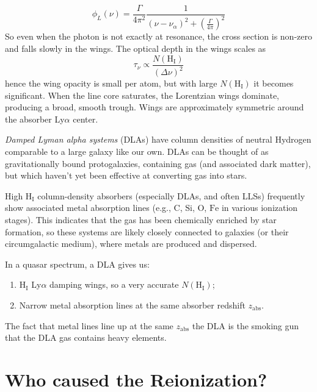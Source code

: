 \begin{equation*}
    \phi_{L}(\nu) = \frac{\Gamma}{4\pi^{2}}\frac{1}{(\nu-\nu_{\alpha})^{2}+\left(\frac{\Gamma}{4\pi}\right)^{2}}
\end{equation*}
So even when the photon is not exactly at resonance, the cross section is non-zero and falls slowly in the wings. The optical depth in the wings scales as
\begin{equation*}
    \tau_{\nu} \propto \frac{N(\text{H}_{\text{I}})}{(\Delta\nu)^{2}}
\end{equation*}
hence the wing opacity is small per atom, but with large $N(\text{H}_{\text{I}})$ it becomes significant. When the line core saturates, the Lorentzian wings dominate, producing a broad, smooth trough. Wings are approximately symmetric around the absorber Ly$\alpha$ center.
\par \emph{Damped Lyman alpha systems} (DLAs) have column densities of neutral Hydrogen comparable to a large galaxy like our own. DLAs can be thought of as gravitationally bound protogalaxies, containing gas (and associated dark matter), but which haven’t yet been effective at converting gas into stars.
\par High $\text{H}_{\text{I}}$ column-density absorbers (especially DLAs, and often LLSs) frequently show associated metal absorption lines (e.g., $\text{C}$, $\text{Si}$, $\text{O}$, $\text{Fe}$ in various ionization stages). This indicates that the gas has been chemically enriched by star formation, so these systems are likely closely connected to galaxies (or their circumgalactic medium), where metals are produced and dispersed.
\par In a quasar spectrum, a DLA gives us:
\begin{enumerate}
    \item $\text{H}_{\text{I}}$ Ly$\alpha$ damping wings, so a very accurate $N(\text{H}_{\text{I}})$;
    \item Narrow metal absorption lines at the same absorber redshift $z_{\text{abs}}$.
\end{enumerate}
The fact that metal lines line up at the same $z_{\text{abs}}$ the DLA is the smoking gun that the DLA gas contains heavy elements.

\section{Who caused the Reionization?}

